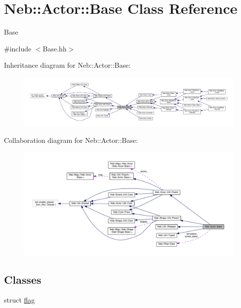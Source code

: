 \hypertarget{classNeb_1_1Actor_1_1Base}{\section{Neb\-:\-:Actor\-:\-:Base Class Reference}
\label{classNeb_1_1Actor_1_1Base}
}


Base  




{\ttfamily \#include $<$Base.\-hh$>$}



Inheritance diagram for Neb\-:\-:Actor\-:\-:Base\-:
\nopagebreak
\begin{figure}[H]
\begin{center}
\leavevmode
\includegraphics[width=350pt]{classNeb_1_1Actor_1_1Base__inherit__graph}
\end{center}
\end{figure}


Collaboration diagram for Neb\-:\-:Actor\-:\-:Base\-:
\nopagebreak
\begin{figure}[H]
\begin{center}
\leavevmode
\includegraphics[width=350pt]{classNeb_1_1Actor_1_1Base__coll__graph}
\end{center}
\end{figure}
\subsection*{Classes}
\begin{DoxyCompactItemize}
\item 
struct \hyperlink{structNeb_1_1Actor_1_1Base_1_1flag}{flag}
\end{DoxyCompactItemize}
